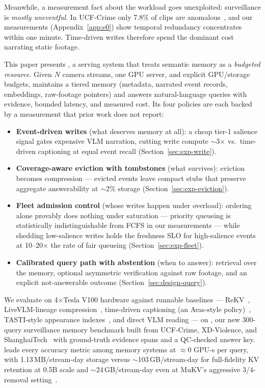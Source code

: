 Meanwhile, a measurement fact about the workload goes unexploited: surveillance is \emph{mostly uneventful}. In UCF-Crime only 7.8\% of clips are anomalous~\cite{ucfcrime}, and our measurements (Appendix~\ref{app:e0}) show temporal redundancy concentrates within one minute. Time-driven writes therefore spend the dominant cost narrating static footage.

This paper presents \sys, a serving system that treats semantic memory as a \emph{budgeted resource}. Given $N$ camera streams, one GPU server, and explicit GPU/storage budgets, \sys maintains a tiered memory (metadata, narrated event records, embeddings, raw-footage pointers) and answers natural-language queries with evidence, bounded latency, and measured cost. Its four policies are each backed by a measurement that prior work does not report:

\begin{itemize}
\item \textbf{Event-driven writes} (what deserves memory at all): a cheap tier-1 salience signal gates expensive VLM narration, cutting write compute $\sim$3$\times$ vs.\ time-driven captioning at equal event recall (Section~\ref{sec:exp-write}).
\item \textbf{Coverage-aware eviction with tombstones} (what survives): eviction becomes compression --- evicted events leave compact stubs that preserve aggregate answerability at $\sim$2\% storage (Section~\ref{sec:exp-eviction}).
\item \textbf{Fleet admission control} (whose writes happen under overload): ordering alone provably does nothing under saturation --- priority queueing is statistically indistinguishable from FCFS in our measurements --- while shedding low-salience writes holds the freshness SLO for high-salience events at 10--20$\times$ the rate of fair queueing (Section~\ref{sec:exp-fleet}).
\item \textbf{Calibrated query path with abstention} (when to answer): retrieval over the memory, optional asymmetric verification against raw footage, and an explicit not-answerable outcome (Section~\ref{sec:design-query}).
\end{itemize}

We evaluate \sys on 4$\times$Tesla V100 hardware against runnable baselines --- ReKV~\cite{rekv}, LiveVLM-lineage compression~\cite{livevlm,mukv}, time-driven captioning (an Avas-style policy)~\cite{avas}, TASTI-style appearance indexes~\cite{tasti}, and direct VLM reading --- on \smb, our new 300-query surveillance memory benchmark built from UCF-Crime, XD-Violence, and ShanghaiTech~\cite{ucfcrime,xdviolence,shanghaitech} with ground-truth evidence spans and a QC-checked answer key. \sys leads every accuracy metric among memory systems at $\approx$0 GPU-s per query, with 1.13\,MB/stream-day storage versus $\sim$103\,GB/stream-day for full-fidelity KV retention at 0.5B scale and $\sim$24\,GB/stream-day even at MuKV's aggressive 3/4-removal setting~\cite{mukv,rekv}.

